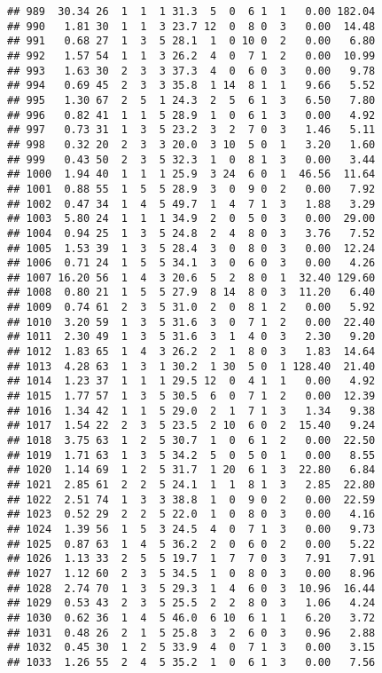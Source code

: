 \documentclass[
]{article}
\begin{document}
\begin{verbatim}
## 989  30.34 26  1  1  1 31.3  5  0  6 1  1   0.00 182.04
## 990   1.81 30  1  1  3 23.7 12  0  8 0  3   0.00  14.48
## 991   0.68 27  1  3  5 28.1  1  0 10 0  2   0.00   6.80
## 992   1.57 54  1  1  3 26.2  4  0  7 1  2   0.00  10.99
## 993   1.63 30  2  3  3 37.3  4  0  6 0  3   0.00   9.78
## 994   0.69 45  2  3  3 35.8  1 14  8 1  1   9.66   5.52
## 995   1.30 67  2  5  1 24.3  2  5  6 1  3   6.50   7.80
## 996   0.82 41  1  1  5 28.9  1  0  6 1  3   0.00   4.92
## 997   0.73 31  1  3  5 23.2  3  2  7 0  3   1.46   5.11
## 998   0.32 20  2  3  3 20.0  3 10  5 0  1   3.20   1.60
## 999   0.43 50  2  3  5 32.3  1  0  8 1  3   0.00   3.44
## 1000  1.94 40  1  1  1 25.9  3 24  6 0  1  46.56  11.64
## 1001  0.88 55  1  5  5 28.9  3  0  9 0  2   0.00   7.92
## 1002  0.47 34  1  4  5 49.7  1  4  7 1  3   1.88   3.29
## 1003  5.80 24  1  1  1 34.9  2  0  5 0  3   0.00  29.00
## 1004  0.94 25  1  3  5 24.8  2  4  8 0  3   3.76   7.52
## 1005  1.53 39  1  3  5 28.4  3  0  8 0  3   0.00  12.24
## 1006  0.71 24  1  5  5 34.1  3  0  6 0  3   0.00   4.26
## 1007 16.20 56  1  4  3 20.6  5  2  8 0  1  32.40 129.60
## 1008  0.80 21  1  5  5 27.9  8 14  8 0  3  11.20   6.40
## 1009  0.74 61  2  3  5 31.0  2  0  8 1  2   0.00   5.92
## 1010  3.20 59  1  3  5 31.6  3  0  7 1  2   0.00  22.40
## 1011  2.30 49  1  3  5 31.6  3  1  4 0  3   2.30   9.20
## 1012  1.83 65  1  4  3 26.2  2  1  8 0  3   1.83  14.64
## 1013  4.28 63  1  3  1 30.2  1 30  5 0  1 128.40  21.40
## 1014  1.23 37  1  1  1 29.5 12  0  4 1  1   0.00   4.92
## 1015  1.77 57  1  3  5 30.5  6  0  7 1  2   0.00  12.39
## 1016  1.34 42  1  1  5 29.0  2  1  7 1  3   1.34   9.38
## 1017  1.54 22  2  3  5 23.5  2 10  6 0  2  15.40   9.24
## 1018  3.75 63  1  2  5 30.7  1  0  6 1  2   0.00  22.50
## 1019  1.71 63  1  3  5 34.2  5  0  5 0  1   0.00   8.55
## 1020  1.14 69  1  2  5 31.7  1 20  6 1  3  22.80   6.84
## 1021  2.85 61  2  2  5 24.1  1  1  8 1  3   2.85  22.80
## 1022  2.51 74  1  3  3 38.8  1  0  9 0  2   0.00  22.59
## 1023  0.52 29  2  2  5 22.0  1  0  8 0  3   0.00   4.16
## 1024  1.39 56  1  5  3 24.5  4  0  7 1  3   0.00   9.73
## 1025  0.87 63  1  4  5 36.2  2  0  6 0  2   0.00   5.22
## 1026  1.13 33  2  5  5 19.7  1  7  7 0  3   7.91   7.91
## 1027  1.12 60  2  3  5 34.5  1  0  8 0  3   0.00   8.96
## 1028  2.74 70  1  3  5 29.3  1  4  6 0  3  10.96  16.44
## 1029  0.53 43  2  3  5 25.5  2  2  8 0  3   1.06   4.24
## 1030  0.62 36  1  4  5 46.0  6 10  6 1  1   6.20   3.72
## 1031  0.48 26  2  1  5 25.8  3  2  6 0  3   0.96   2.88
## 1032  0.45 30  1  2  5 33.9  4  0  7 1  3   0.00   3.15
## 1033  1.26 55  2  4  5 35.2  1  0  6 1  3   0.00   7.56

\end{verbatim}
\end{document}
